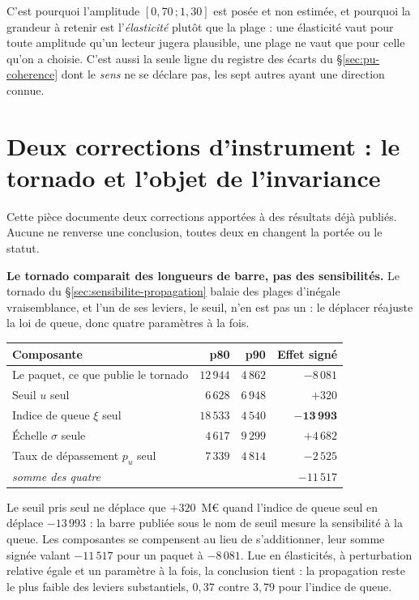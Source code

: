 C'est pourquoi l'amplitude $[0{,}70\,;1{,}30]$ est posée et non estimée, et pourquoi la
grandeur à retenir est l'\emph{élasticité} plutôt que la plage : une élasticité vaut pour toute
amplitude qu'un lecteur jugera plausible, une plage ne vaut que pour celle qu'on a choisie. C'est
aussi la seule ligne du registre des écarts du \S\ref{sec:pu-coherence} dont le \emph{sens} ne se
déclare pas, les sept autres ayant une direction connue.

\section{Deux corrections d'instrument : le tornado et l'objet de l'invariance}
\label{sec:ann-corrections-instrument}

Cette pièce documente deux corrections apportées à des résultats déjà publiés. Aucune ne renverse
une conclusion, toutes deux en changent la portée ou le statut.

\textbf{Le tornado comparait des longueurs de barre, pas des sensibilités.} Le tornado du
\S\ref{sec:sensibilite-propagation} balaie des plages d'inégale vraisemblance, et l'un de ses
leviers, le seuil, n'en est pas un : le déplacer réajuste la loi de queue, donc quatre paramètres à
la fois.

\begin{center}\footnotesize
\renewcommand{\arraystretch}{1.2}
\begin{tabular}{@{}l r r r@{}}
\toprule
\textbf{Composante} & \textbf{p80} & \textbf{p90} & \textbf{Effet signé} \\
\midrule
Le paquet, ce que publie le tornado & $12\,944$ & $4\,862$ & $-8\,081$ \\
\midrule
Seuil $u$ seul & $6\,628$ & $6\,948$ & $+320$ \\
Indice de queue $\xi$ seul & $18\,533$ & $4\,540$ & $\mathbf{-13\,993}$ \\
Échelle $\sigma$ seule & $4\,617$ & $9\,299$ & $+4\,682$ \\
Taux de dépassement $p_u$ seul & $7\,339$ & $4\,814$ & $-2\,525$ \\
\midrule
\emph{somme des quatre} & & & $-11\,517$ \\
\bottomrule
\end{tabular}
\end{center}

\vspace{4pt}
\noindent Le seuil pris seul ne déplace que $+320$~M\euro{} quand l'indice de queue seul en
déplace $-13\,993$ : la barre publiée sous le nom de \og seuil \fg{} mesure la sensibilité à la
queue. Les composantes se compensent au lieu de s'additionner, leur somme signée valant
$-11\,517$ pour un paquet à $-8\,081$. Lue en élasticités, à perturbation relative égale et un
paramètre à la fois, la conclusion tient : la propagation reste le plus faible des leviers
substantiels, $0{,}37$ contre $3{,}79$ pour l'indice de queue.

